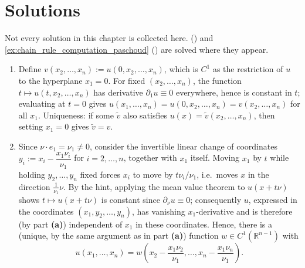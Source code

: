 
\section{Solutions}
\label{sec:chain_rule_solutions}

Not every solution in this chapter is collected here. 
() and \cref{ex:chain_rule_computation_paschoud}
() are solved where they appear.

\begin{exercisesolution}
\label{sol:directional_derivative_vanishes}
\begin{enumerate}[label=\textbf{(\alph*)}]
  \item Define $v(x_2,\dots,x_n) := u(0,x_2,\dots,x_n)$, which is $C^1$ as the restriction of $u$
    to the hyperplane $x_1 = 0$. For fixed $(x_2,\dots,x_n)$, the function
    $t \mapsto u(t,x_2,\dots,x_n)$ has derivative $\partial_1 u \equiv 0$ everywhere, hence is
    constant in $t$; evaluating at $t=0$ gives $u(x_1,\dots,x_n) = u(0,x_2,\dots,x_n) =
    v(x_2,\dots,x_n)$ for all $x_1$. Uniqueness: if some $\tilde v$ also satisfies
    $u(x) = \tilde v(x_2,\dots,x_n)$, then setting $x_1 = 0$ gives $\tilde v = v$.
  \item Since $\nu\cdot e_1 = \nu_1 \neq 0$, consider the invertible linear change of coordinates
    $y_i := x_i - \dfrac{x_1\nu_i}{\nu_1}$ for $i = 2,\dots,n$, together with $x_1$ itself.
    Moving $x_1$ by $t$ while holding $y_2,\dots,y_n$ fixed forces $x_i$ to move by
    $t\nu_i/\nu_1$, i.e.\ moves $x$ in the direction $\tfrac{1}{\nu_1}\nu$. By the hint, applying
    the mean value theorem to $u(x+t\nu)$ shows $t \mapsto u(x+t\nu)$ is constant since
    $\partial_\nu u \equiv 0$; consequently $u$, expressed in the coordinates $(x_1, y_2,\dots,
    y_n)$, has vanishing $x_1$-derivative and is therefore (by part \textbf{(a)}) independent of
    $x_1$ in these coordinates. Hence, there is a (unique, by the same argument as in part
    \textbf{(a)}) function $w \in C^1(\mathbb{R}^{n-1})$ with
    \[
    u(x_1,\dots,x_n) = w\!\left(x_2 - \frac{x_1\nu_2}{\nu_1},\dots,x_n - \frac{x_1\nu_n}{\nu_1}\right).
\]
\end{enumerate}
\end{exercisesolution}
